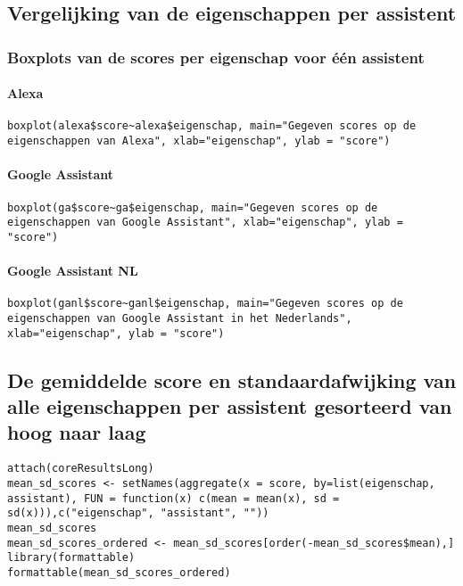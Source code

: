 \subsection{Vergelijking van de eigenschappen per assistent}
\subsubsection{Boxplots van de scores per eigenschap voor één assistent}
\paragraph{Alexa}
\begin{lstlisting}
boxplot(alexa$score~alexa$eigenschap, main="Gegeven scores op de eigenschappen van Alexa", xlab="eigenschap", ylab = "score")
\end{lstlisting}

\paragraph{Google Assistant}
\begin{lstlisting}
boxplot(ga$score~ga$eigenschap, main="Gegeven scores op de eigenschappen van Google Assistant", xlab="eigenschap", ylab = "score")
\end{lstlisting}

\paragraph{Google Assistant NL}
\begin{lstlisting}
boxplot(ganl$score~ganl$eigenschap, main="Gegeven scores op de eigenschappen van Google Assistant in het Nederlands", xlab="eigenschap", ylab = "score")
\end{lstlisting}

\subsection{De gemiddelde score en standaardafwijking van alle eigenschappen per assistent gesorteerd van hoog naar laag}
\begin{lstlisting}
attach(coreResultsLong)
mean_sd_scores <- setNames(aggregate(x = score, by=list(eigenschap, assistant), FUN = function(x) c(mean = mean(x), sd = sd(x))),c("eigenschap", "assistant", ""))
mean_sd_scores
mean_sd_scores_ordered <- mean_sd_scores[order(-mean_sd_scores$mean),]
library(formattable)
formattable(mean_sd_scores_ordered)
\end{lstlisting}

